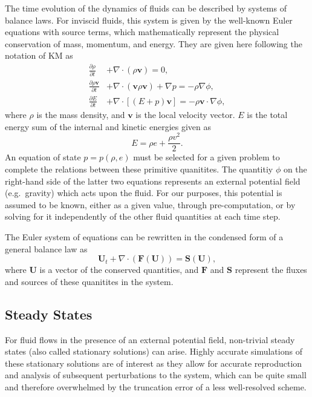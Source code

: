 The time evolution of the dynamics of fluids can be described by systems of balance laws. For inviscid fluids, this system is given by the well-known Euler equations with source terms, which mathematically represent the physical conservation of mass, momentum, and energy. They are given here following the notation of KM as
\begin{align} \label{eq:eulerFull}
\frac{\partial{\rho}}{\partial{t}} &+ \nabla \cdot (\rho \mathbf{v}) = 0,\\
\frac{\partial{\rho \mathbf{v}}}{\partial{t}} &+ \nabla \cdot (\mathbf{v} \rho \mathbf{v}) + \nabla p = -\rho \nabla \phi,\\
\frac{\partial{E}}{\partial{t}} &+ \nabla \cdot \left[(E+p)\mathbf{v}\right] = -\rho \mathbf{v} \cdot \nabla \phi,
\end{align}
where $\rho$ is the mass density, and $\mathbf{v}$ is the local velocity vector. $E$ is the total energy sum of the internal and kinetic energies given as $$E=\rho e + \frac{\rho v^2}{2}.$$  An equation of state $p=p(\rho,e)$ must be selected for a given problem to complete the relations between these primitive quanitites. The quantitiy $\phi$ on the right-hand side of the latter two equations represents an external potential field (e.g.\ gravity) which acts upon the fluid. For our purposes, this potential is assumed to be known, either as a given value, through pre-computation, or by solving for it independently of the other fluid quantities at each time step.

The Euler system of equations can be rewritten in the condensed form of a general balance law as
\begin{equation} \label{eq:euler}
\mathbf{U}_t+\nabla\cdot(\mathbf{F}(\mathbf{U}))=\mathbf{S}(\mathbf{U}),
\end{equation}
where $\mathbf{U}$ is a vector of the conserved quantities, and $\mathbf{F}$ and $\mathbf{S}$ represent the fluxes and sources of these quanitites in the system.

\subsection{Steady States}

For fluid flows in the presence of an external potential field, non-trivial steady states (also called stationary solutions) can arise. Highly accurate simulations of these stationary solutions are of interest as they allow for accurate reproduction and analysis of subsequent perturbations to the system, which can be quite small and therefore overwhelmed by the truncation error of a less well-resolved scheme.

